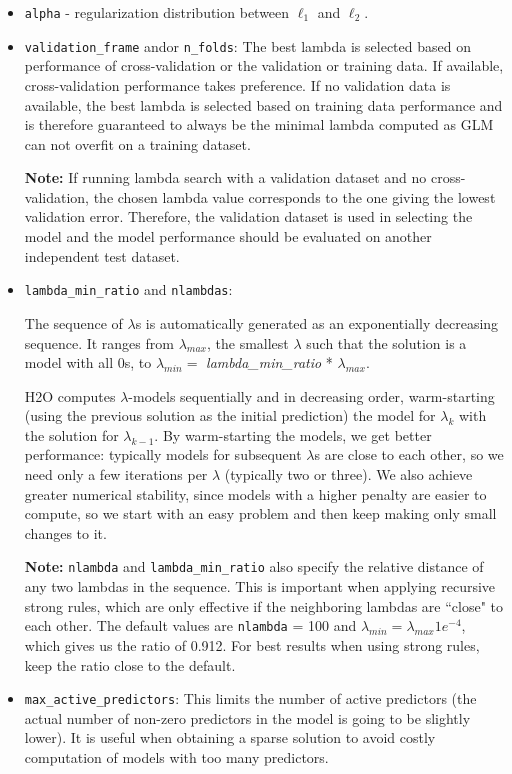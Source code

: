 \begin{itemize}
\item \texttt{alpha} - regularization distribution between  $\ell_1$ and  $\ell_2$.
\item \texttt{validation\_frame} and\/or \texttt{n\_folds}:
The best lambda is selected based on performance of cross-validation or the validation or training data. If available, cross-validation performance takes preference. If no validation data is available, the best lambda is selected based on training data performance and is therefore guaranteed to always be the minimal lambda computed as GLM can not overfit on a training dataset.
 
\textbf{Note:} If running lambda search with a validation dataset and no cross-validation, the chosen lambda value corresponds to the one giving the lowest validation error. Therefore, the validation dataset is used in selecting the model and the model performance should be evaluated on another independent test dataset. 

\item \texttt{lambda\_min\_ratio} and \texttt{nlambdas}: 

The sequence of $\lambda$s is automatically generated as an exponentially decreasing sequence. It ranges from $\lambda_{max}$,
the smallest $\lambda$ such that the solution is a model with all 0s, to $\lambda_{min} =
$ \textit{lambda\_min\_ratio} * $ \lambda_{max}$.

H2O computes $\lambda$-models sequentially and in decreasing order, warm-starting (using the previous solution as
the initial prediction) the model for $\lambda_k$ with the solution for $\lambda_{k-1}$. By warm-starting the
models, we get better performance: typically models for subsequent $\lambda$s are close to each other, so we need
only a few iterations per $\lambda$ (typically two or three). We also achieve greater numerical stability, since models
with a higher penalty are easier to compute, so we start with an easy problem and then keep making only small
changes to it.


\textbf{Note:} \texttt{nlambda} and \texttt{lambda\_min\_ratio} also specify the relative distance of any two
 lambdas in the sequence. This is important when applying recursive strong rules, which are only effective if the
neighboring lambdas are ``close" to each other. The default values are \texttt{nlambda} = 100 and $\lambda_{min}
= \lambda_{max} 1e^{-4}$, which gives us the ratio of 0.912.  For best results when using strong rules, keep the
ratio close to the default.

\item \texttt{max\_active\_predictors}: This limits the number of active predictors (the actual number of non-zero predictors in the model is going to be slightly lower). It is useful when obtaining a sparse solution to avoid costly computation of models with too many predictors.

\end{itemize}


